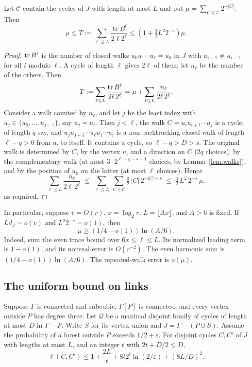 \begin{lemma}\label{lem:polynomial-repeated-walks}
Let $\mathcal C$ contain the cycles of $J$ with length at most $L$ and put $\mu=\sum_{C\in\mathcal C}2^{-|C|}$.
Then
\[
 \mu\le T:=\sum_{\ell\le L}\frac{\operatorname{tr}B^\ell}{2\ell2^\ell}
 \le\left(1+\tfrac32L^2 2^{-s}\right)\mu.
\]
\end{lemma}
\begin{proof}
$\operatorname{tr} B^{\ell}$ is the number of closed walks $u_0u_1\cdots u_\ell=u_0$ in $J$ with
$u_{i+1}\ne u_{i-1}$ for all $i$ modulo $\ell$. A cycle of length $\ell$ gives $2\ell$ of them; let
$n_\ell$ be the number of the others. Then
\[
  T:=\sum_{\ell\le L}\frac{\operatorname{tr} B^{\ell}}{2\ell\,2^{\ell}}=\mu+\sum_{\ell\le L}\frac{n_\ell}{2\ell\,2^{\ell}} .
\]
Consider a walk counted by $n_\ell$, and let $j$ be the least index with
$u_j\in\{u_0,\dots,u_{j-1}\}$, say $u_j=u_i$. Then $j<\ell$, the walk $C=u_iu_{i+1}\cdots u_j$ is a
cycle, of length $q$ say, and $u_ju_{j+1}\cdots u_\ell u_1\cdots u_i$ is a non-backtracking closed
walk of length $\ell-q>0$ from $u_i$ to itself. It contains a cycle, so $\ell-q>D>s$. The original
walk is determined by $C$, by the vertex $u_i$ and a direction on $C$ ($2q$ choices), by the
complementary walk (at most $3\cdot2^{\ell-q-s-1}$ choices, by Lemma~\ref{lem:walks}), and by the
position of $u_0$ on the latter (at most $\ell$ choices). Hence
\[
  \sum_{\ell\le L}\frac{n_\ell}{2\ell\,2^{\ell}}
  \;\le\;\sum_{\ell\le L}\ \sum_{C\in\mathcal{C}}\tfrac32\,|C|\,2^{-|C|-s}
  \;\le\;\tfrac32\,L^{2}\,2^{-s}\,\mu,
\]
as required.


\end{proof}

In particular, suppose $v=O(r)$, $x=\log_2r$, $L=\lfloor Ax\rfloor$, and $A>6$ is fixed.
If $Ld_J=o(v)$ and $L^2 2^{-s}=o(1)$, then
\[
 \mu\ge(1/4-o(1))\ln(A/6).
\]
Indeed, sum the even trace bound over $6x\le\ell\le L$.
Its normalized leading term is $1-o(1)$, and its nonreal error is $O(r^{-2})$.
The even harmonic sum is $(1/4-o(1))\ln(A/6)$.
The repeated-walk error is $o(\mu)$.

\subsection{The uniform bound on links}
Suppose $\Gamma$ is connected and subcubic, $\Gamma[P]$ is connected, and every vertex outside $P$ has degree three.
Let $\mathcal Q$ be a maximal disjoint family of cycles of length at most $D$ in $\Gamma-P$.
Write $S$ for its vertex union and $J=\Gamma-(P\cup S)$.
Assume the probability of a forest outside $P$ exceeds $1/2+\varepsilon$.
For disjoint cycles $C,C'$ of $J$ with lengths at most $L$, and an integer $t$ with $2t+D/2\le D$,
\begin{equation}\label{eq:polynomial-foundation-links}
 \ell(C,C')\le1+\frac{2L}{t}+8t2^t\ln(2/\varepsilon)+(8L/D)^2.
\end{equation}

